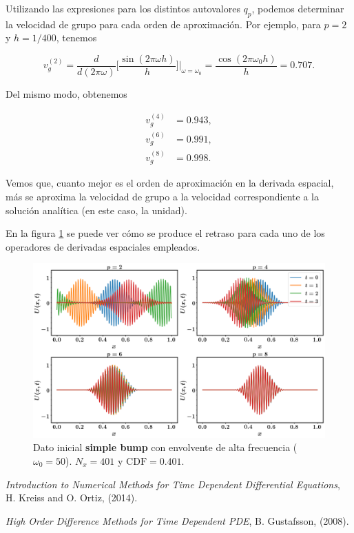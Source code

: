 \documentclass[12pt]{article}
\begin{document}
Utilizando las expresiones para los distintos autovalores $q_p$, podemos determinar la velocidad de grupo para cada orden de aproximaci\'on. Por ejemplo, para $p=2$ y $h = 1/400$, tenemos

\begin{equation}
v_g^{(2)} = \dfrac{d}{d (2\pi\omega)}\bigg[ \dfrac{\sin(2\pi\omega h)}{h}\bigg]\bigg|_{\omega = \omega_{0}} = \dfrac{\cos(2\pi\omega_0 h)}{h} = 0.707.
\end{equation}

Del mismo modo, obtenemos

\begin{align}
v_g^{(4)} &= 0.943,\\
v_g^{(6)} &= 0.991,\\
v_g^{(8)} &= 0.998.
\end{align}

Vemos que, cuanto mejor es el orden de aproximaci\'on en la derivada espacial, m\'as se aproxima la velocidad de grupo a la velocidad correspondiente a la soluci\'on anal\'itica (en este caso, la unidad).

En la figura \ref{fig:envolvente} se puede ver c\'omo se produce el retraso para cada uno de los operadores de derivadas espaciales empleados.


\begin{figure}
\center
\includegraphics[scale=0.3]{envolvente.png}
\caption{Dato inicial \textbf{simple bump} con envolvente de alta frecuencia ($\omega_0 = 50$).  $N_x=401$ y $\mathrm{CDF} = 0.401$.} \label{fig:envolvente}
\end{figure}



\begin{thebibliography}{1}

 {\em Introduction to Numerical Methods for Time Dependent Differential Equations}, H. Kreiss and O. Ortiz, (2014).

 {\em High Order Difference Methods for Time Dependent PDE}, B. Gustafsson, (2008).

\end{thebibliography}
\end{document}
